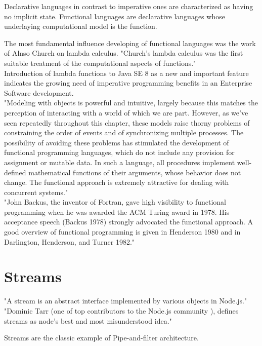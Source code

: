 Declarative languages in contrast to imperative ones  are characterized as having no implicit state. Functional languages are declarative languages whose underlaying computational model is the function.\cite{Hudak}

The most fundamental influence developing of functional languages was the work of Alnso Church on lambda calculus. "Church’s lambda calculus was the first suitable treatment of the computational aspects of functions."\cite{Hudak}\\

Introduction of lambda functions to Java SE 8 as a new and important feature\cite{javase} indicates the growing need of imperative programming benefits in an Enterprise Software development.\\

"Modeling with objects is powerful and intuitive, largely because this matches the perception of interacting with a world of which we are part. However, as we've seen repeatedly throughout this chapter, these models raise thorny problems of constraining the order of events and of synchronizing multiple processes. The possibility of avoiding these problems has stimulated the development of functional programming languages, which do not include any provision for assignment or mutable data. In such a language, all procedures implement well-defined mathematical functions of their arguments, whose behavior does not change. The functional approach is extremely attractive for dealing with concurrent systems." \cite{sicp}\\

"John Backus, the inventor of Fortran, gave high visibility to functional programming when he was awarded the ACM Turing award in 1978. His acceptance speech (Backus 1978) strongly advocated the functional approach. A good overview of functional programming is given in Henderson 1980 and in Darlington, Henderson, and Turner 1982."\cite{sicp}\\

\section{Streams}
"A stream is an abstract interface implemented by various objects in Node.js." \cite{nodejsstreams}
"Dominic Tarr (one of top contributors to the Node.js community \cite{nodejscontributors}), defines streams as node's best and most misunderstood idea."\cite{nodejsbook}

Streams are the classic example of Pipe-and-filter architecture.

